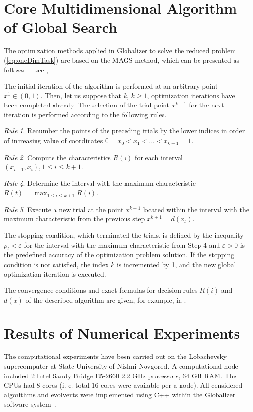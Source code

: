 \documentclass[3p,times,procedia]{elsarticle}
\begin{document}
\section{Core Multidimensional Algorithm of Global Search}

The optimization methods applied in Globalizer to solve the reduced problem
(\ref{eq:oneDimTask}) are based on the MAGS method, which can be presented as follows ---
see \cite{strongin1978}, \cite{strSergGO}.
\par
The initial iteration of the algorithm is performed at an arbitrary point \mbox{\(x^1\in(0,1)\)}.
Then, let us suppose that \(k\), \(k\ge 1\), optimization iterations have been completed already.
The selection of the trial point \(x^{k+1}\) for the next iteration is performed according to the
following rules.

\textit{Rule 1}. Renumber the points of the preceding trials by the lower indices in order of
increasing value of coordinates
$0=x_0<x_1<...<x_{k+1}=1$.

\textit{Rule 2}. Compute the characteristics \(R(i)\) for each interval \((x_{i-1},x_i),1\leq i\leq
k+1\).

\textit{Rule 4}. Determine the interval with the maximum characteristic $R(t)=\max_{1\leq i
\leq k+1}R(i)$.

\textit{Rule 5}. Execute a new trial at the point \(x^{k+1}\) located within the interval with the
maximum characteristic from the previous step
  $x^{k+1}=d(x_t)$.

The stopping condition, which terminated the trials, is defined by the inequality
$\rho_t<\varepsilon$
for the interval with the maximum characteristic from Step 4 and \(\varepsilon >0\) is the
predefined
accuracy of the optimization problem solution. If the stopping condition is not satisfied,
the index \(k\) is incremented by 1, and the new global optimization iteration is executed.

The convergence conditions and exact formulas for decision rules $R(i)$ and $d(x)$ of the
described algorithm are given, for example, in \cite{strSergGO}.

\section{Results of Numerical Experiments}

The computational experiments have been carried out on the Lobachevsky supercomputer at
State University of Nizhni Novgorod. A computational node included 2 Intel
Sandy Bridge E5-2660 2.2 GHz processors, 64 GB RAM. The CPUs had 8 cores (i. e. total 16
cores were available per a node). All considered algorithms and evolvents were implemented
using C++ within the Globalizer software system~\cite{globalizerSystem}.
\end{document}
